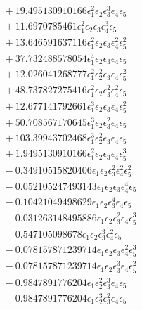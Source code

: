 \documentclass[10pt]{article}
\begin{document}
\begin{align*}
&{}  + 19.495130910166 \epsilon_{1}^{2} \epsilon_{2} \epsilon_{3}^{3} \epsilon_{4} \epsilon_{5} \\
&{}  + 11.6970785461 \epsilon_{1}^{2} \epsilon_{2} \epsilon_{3} \epsilon_{4}^{3} \epsilon_{5} \\
&{}  + 13.646591637116 \epsilon_{1}^{2} \epsilon_{2} \epsilon_{3} \epsilon_{4}^{2} \epsilon_{5}^{2} \\
&{}  + 37.732488578054 \epsilon_{1}^{4} \epsilon_{2} \epsilon_{3} \epsilon_{4} \epsilon_{5} \\
&{}  + 12.026041268777 \epsilon_{1}^{2} \epsilon_{2}^{2} \epsilon_{3} \epsilon_{4} \epsilon_{5}^{2} \\
&{}  + 48.737827275416 \epsilon_{1}^{2} \epsilon_{2} \epsilon_{3}^{2} \epsilon_{4}^{2} \epsilon_{5} \\
&{}  + 12.677141792661 \epsilon_{1}^{3} \epsilon_{2} \epsilon_{3} \epsilon_{4} \epsilon_{5}^{2} \\
&{}  + 50.708567170645 \epsilon_{1}^{3} \epsilon_{2} \epsilon_{3}^{2} \epsilon_{4} \epsilon_{5} \\
&{}  + 103.39943702468 \epsilon_{1}^{3} \epsilon_{2}^{2} \epsilon_{3} \epsilon_{4} \epsilon_{5} \\
&{}  + 1.9495130910166 \epsilon_{1}^{2} \epsilon_{2} \epsilon_{3} \epsilon_{4} \epsilon_{5}^{3} \\
&{}  - 0.34910515820406 \epsilon_{1} \epsilon_{2} \epsilon_{3}^{2} \epsilon_{4}^{2} \epsilon_{5}^{2} \\
&{}  - 0.052105247493143 \epsilon_{1} \epsilon_{2} \epsilon_{3} \epsilon_{4}^{4} \epsilon_{5} \\
&{}  - 0.10421049498629 \epsilon_{1} \epsilon_{2} \epsilon_{3}^{4} \epsilon_{4} \epsilon_{5} \\
&{}  - 0.031263148495886 \epsilon_{1} \epsilon_{2} \epsilon_{3}^{2} \epsilon_{4} \epsilon_{5}^{3} \\
&{}  - 0.547105098678 \epsilon_{1} \epsilon_{2} \epsilon_{3}^{3} \epsilon_{4}^{2} \epsilon_{5} \\
&{}  - 0.078157871239714 \epsilon_{1} \epsilon_{2} \epsilon_{3} \epsilon_{4}^{2} \epsilon_{5}^{3} \\
&{}  - 0.078157871239714 \epsilon_{1} \epsilon_{2} \epsilon_{3}^{3} \epsilon_{4} \epsilon_{5}^{2} \\
&{}  - 0.9847891776204 \epsilon_{1} \epsilon_{2}^{2} \epsilon_{3}^{3} \epsilon_{4} \epsilon_{5} \\
&{}  - 0.9847891776204 \epsilon_{1} \epsilon_{2}^{3} \epsilon_{3}^{2} \epsilon_{4} \epsilon_{5} \\

\end{align*}
\end{document}
